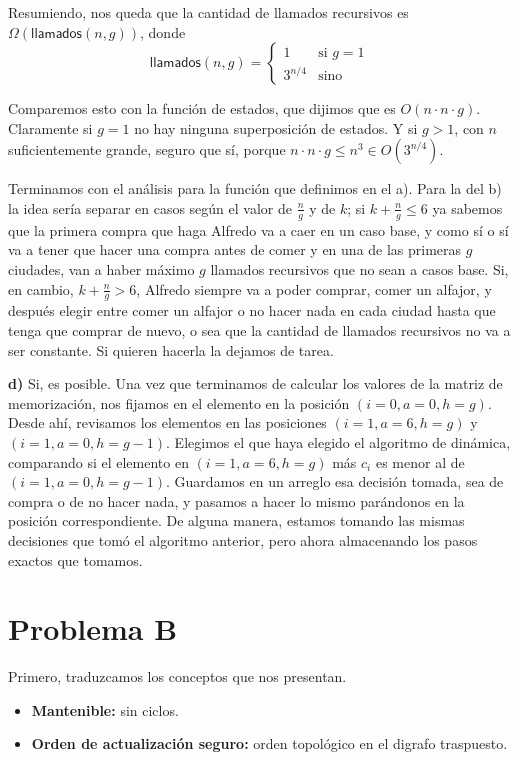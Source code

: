 \documentclass{article}
\begin{document}
Resumiendo, nos queda que la cantidad de llamados recursivos es $\Omega(\mathsf{llamados}(n, g))$, donde \[
\mathsf{llamados}(n,g) = \begin{cases}
1 & \text{si } g = 1\\
3^{n/4} & \text{sino}
\end{cases}
\]

Comparemos esto con la función de estados, que dijimos que es $O(n \cdot n \cdot g)$. Claramente si $g=1$ no hay ninguna superposición de estados. Y si $g > 1$, con $n$ suficientemente grande, seguro que sí, porque $n \cdot n \cdot g \leq n^3 \in O(3^{n/4})$.

Terminamos con el análisis para la función que definimos en el a). Para la del b) la idea sería separar en casos según el valor de $\frac{n}{g}$ y de $k$; si $k + \frac{n}{g} \leq 6$ ya sabemos que la primera compra que haga Alfredo va a caer en un caso base, y como sí o sí va a tener que hacer una compra antes de comer y en una de las primeras $g$ ciudades, van a haber máximo $g$ llamados recursivos que no sean a casos base. Si, en cambio, $k + \frac{n}{g} > 6$, Alfredo siempre va a poder comprar, comer un alfajor, y después elegir entre comer un alfajor o no hacer nada en cada ciudad hasta que tenga que comprar de nuevo, o sea que la cantidad de llamados recursivos no va a ser constante. Si quieren hacerla la dejamos de tarea.

\textbf{d)} Si, es posible. Una vez que terminamos de calcular los valores de la matriz de memorización, nos fijamos en el elemento en la posición $(i=0, a=0, h=g)$. Desde ahí, revisamos los elementos en las posiciones $(i=1, a=6, h=g)$ y $(i=1, a=0, h=g-1)$. Elegimos el que haya elegido el algoritmo de dinámica, comparando si el elemento en $(i=1, a=6, h=g)$ más $c_i$ es menor al de $(i=1, a=0, h=g-1)$. Guardamos en un arreglo esa decisión tomada, sea de compra o de no hacer nada, y pasamos a hacer lo mismo parándonos en la posición correspondiente. De alguna manera, estamos tomando las mismas decisiones que tomó el algoritmo anterior, pero ahora almacenando los pasos exactos que tomamos.

\section*{Problema B}

Primero, traduzcamos los conceptos que nos presentan.
\begin{itemize}
\item \textbf{Mantenible:} sin ciclos.
\item \textbf{Orden de actualización seguro:} orden topológico en el digrafo traspuesto.
\end{itemize}
\end{document}
